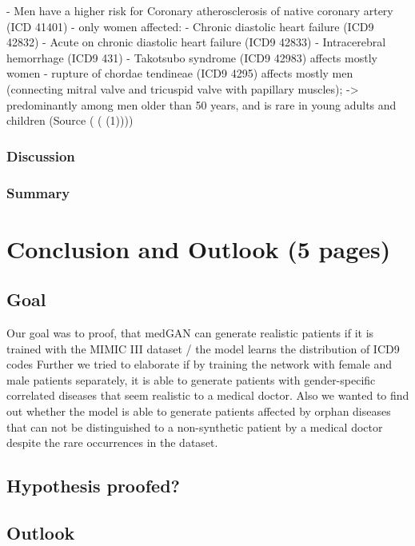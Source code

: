 \documentclass[11pt, a4paper]{book}
\begin{document}
- Men have a higher risk for  Coronary atherosclerosis of native coronary artery (ICD 41401)
- only women affected:
  - Chronic diastolic heart failure (ICD9 42832)
  - Acute on chronic diastolic heart failure  (ICD9 42833)
  - Intracerebral hemorrhage (ICD9 431)
- Takotsubo syndrome (ICD9 42983) affects mostly women
- rupture of chordae tendineae (ICD9 4295) affects mostly men (connecting mitral valve and tricuspid valve with papillary muscles); 
  -> predominantly among men older than 50 years, and is rare in young adults and children (Source ( ( (1))))


\subsection{Discussion}

\subsection{Summary}

\chapter{Conclusion and Outlook (5 pages)}
\section{Goal}
Our goal was to proof, that medGAN can generate realistic patients if it is trained with the MIMIC III dataset / the model learns the distribution of ICD9 codes 
Further we tried to elaborate if by training the network with female and male patients separately, it is able to generate patients with gender-specific correlated diseases that seem realistic to a medical doctor.
Also we wanted to find out whether the model is able to generate patients affected by orphan diseases that can not be distinguished to a non-synthetic patient by a medical doctor despite the rare occurrences in the dataset.

\section{Hypothesis proofed?}
\section{Outlook}
\end{document}
